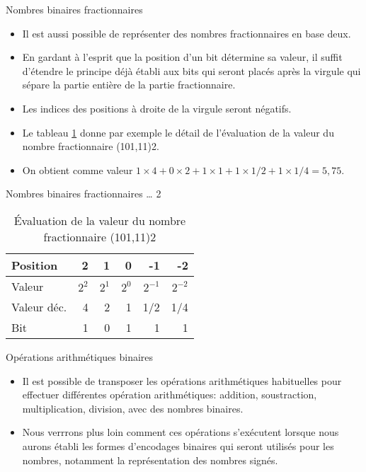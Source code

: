 \documentclass[presentation]{beamer}
\begin{document}
\begin{frame}[label={sec:org5007741}]{Nombres binaires fractionnaires}
\begin{itemize}
\item Il est aussi possible de représenter des nombres fractionnaires en base deux.

\item En gardant à l'esprit que la position d'un bit détermine sa valeur, il suffit d'étendre le principe déjà établi aux bits qui seront placés après la virgule qui sépare la partie entière de la partie fractionnaire.

\item Les indices des positions à droite de la virgule seront négatifs.

\item Le tableau \ref{tab:orgb5909a7} donne par exemple le détail de l'évaluation de la valeur du nombre fractionnaire (101,11)2.

\item On obtient comme valeur \(1 \times 4 + 0 \times 2 + 1 \times 1 + 1 \times 1/2 + 1 \times 1/4 = 5,75\).
\end{itemize}
\end{frame}

\begin{frame}[label={sec:org199441b}]{Nombres binaires fractionnaires \ldots{} 2}
\begin{table}[htbp]
\caption{\label{tab:orgb5909a7}Évaluation de la valeur du nombre fractionnaire (101,11)2}
\centering
\begin{tabular}{lrrrrr}
Position & 2 & 1 & 0 & -1 & -2\\
\hline
Valeur & \(2^2\) & \(2^1\) & \(2^0\) & \(2^{-1}\) & \(2^{-2}\)\\
Valeur déc. & 4 & 2 & 1 & 1/2 & 1/4\\
Bit & 1 & 0 & 1 & 1 & 1\\
\end{tabular}
\end{table}
\end{frame}

\begin{frame}[label={sec:org89e4352}]{Opérations arithmétiques binaires}
\begin{itemize}
\item Il est possible de transposer les opérations arithmétiques habituelles pour effectuer différentes opération arithmétiques: addition, soustraction, multiplication, division, avec des nombres binaires.

\item Nous verrrons plus loin comment ces opérations s'exécutent lorsque nous aurons établi les formes d'encodages binaires qui seront utilisés pour les nombres, notamment la représentation des nombres signés.
\end{itemize}
\end{frame}
\end{document}
